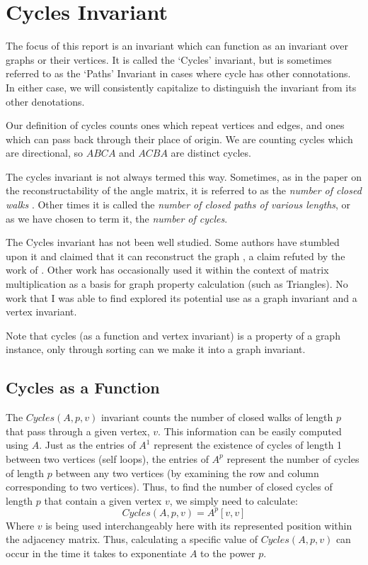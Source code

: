 \section{Cycles Invariant}
The focus of this report is an invariant which can function as an invariant over graphs or their vertices.
It is called the `Cycles' invariant, but is sometimes referred to as the `Paths' Invariant in cases where cycle has other connotations.
In either case, we will consistently capitalize to distinguish the invariant from its other denotations.

Our definition of cycles counts ones which repeat vertices and edges, and ones which can pass back through their place of origin.
We are counting cycles which are directional, so $ABCA$ and $ACBA$ are distinct cycles.

The cycles invariant is not always termed this way.
Sometimes, as in the paper on the reconstructability of the angle matrix, it is referred to as the \emph{number of closed walks} \cite{eigenspaces}.
Other times it is called the \emph{number of closed paths of various lengths}, or as we have chosen to term it, the \emph{number of cycles}.

The Cycles invariant has not been well studied. 
Some authors have stumbled upon it and claimed that it can reconstruct the graph \cite{cornell}, a claim refuted by the work of \cite{eigenspaces}.
Other work has occasionally used it within the context of matrix multiplication as a basis for graph property calculation (such as Triangles).
No work that I was able to find explored its potential use as a graph invariant and a vertex invariant. 

Note that cycles (as a function and vertex invariant) is a property of a graph instance, only through sorting can we make it into a graph invariant.


\subsection{Cycles as a Function}

The $Cycles(A, p, v)$ invariant counts the number of closed walks of length $p$ that pass through a given vertex, $v$. 
This information can be easily computed using $A$. 
Just as the entries of $A^1$ represent the existence of cycles of length 1 between two vertices (self loops), the entries of $A^p$ represent the number of cycles of length $p$ between any two vertices (by examining the row and column corresponding to two vertices).
Thus, to find the number of closed cycles of length $p$ that contain a given vertex $v$, we simply need to calculate: 
$$Cycles(A, p, v) = A^p[v, v]$$
Where $v$ is being used interchangeably here with its represented position within the adjacency matrix. 
Thus, calculating a specific value of $Cycles(A, p, v)$ can occur in the time it takes to exponentiate $A$ to the power $p$.

